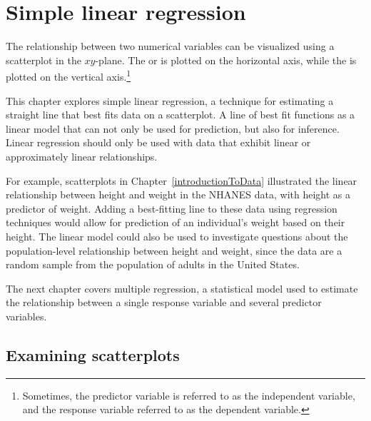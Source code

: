
\chapter{Simple linear regression}
\label{linRegrForTwoVar}

The relationship between two numerical variables can be visualized using a scatterplot in the $xy$-plane. The  or  is plotted on the horizontal axis, while the  is plotted on the vertical axis.\footnote{Sometimes, the predictor variable is referred to as the independent variable, and the response variable referred to as the dependent variable.} 

This chapter explores simple linear regression, a technique for estimating a straight line that best fits data on a scatterplot. A line of best fit functions as a linear model that can not only be used for prediction, but also for inference. Linear regression should only be used with data that exhibit linear or approximately linear relationships. 

For example, scatterplots in Chapter~\ref{introductionToData} illustrated the linear relationship between height and weight in the NHANES data, with height as a predictor of weight. Adding a best-fitting line to these data using regression techniques would allow for prediction of an individual's weight based on their height. The linear model could also be used to investigate questions about the population-level relationship between height and weight, since the data are a random sample from the population of adults in the United States. 

The next chapter covers multiple regression, a statistical model used to estimate the relationship between a single response variable and several predictor variables.

\section{Examining scatterplots}
\label{examiningScatterPlots}

